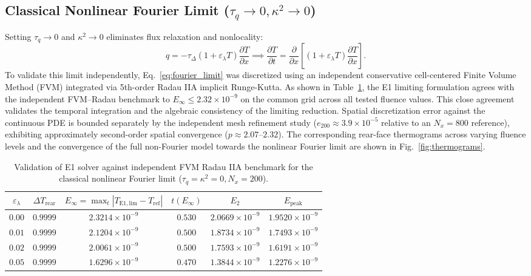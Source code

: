 \documentclass[preprint,12pt,a4paper]{elsarticle}
\begin{document}
\subsection{Classical Nonlinear Fourier Limit ($\tau_q \to 0, \kappa^2 \to 0$)}
Setting $\tau_q \to 0$ and $\kappa^2 \to 0$ eliminates flux relaxation and nonlocality:
\begin{equation}
  q = -\tau_\Delta (1 + \varepsilon_\lambda T) \frac{\partial T}{\partial x} \implies \frac{\partial T}{\partial t} = \frac{\partial}{\partial x}\left[\left(1 + \varepsilon_\lambda T\right)\frac{\partial T}{\partial x}\right] .
  \label{eq:fourier_limit}
\end{equation}
To validate this limit independently, Eq.~\eqref{eq:fourier_limit} was discretized using an independent conservative cell-centered Finite Volume Method (FVM) integrated via 5th-order Radau IIA implicit Runge-Kutta. As shown in Table~\ref{tab:fourier_val}, the E1 limiting formulation agrees with the independent FVM--Radau benchmark to $E_\infty \le 2.32 \times 10^{-9}$ on the common grid across all tested fluence values. This close agreement validates the temporal integration and the algebraic consistency of the limiting reduction. Spatial discretization error against the continuous PDE is bounded separately by the independent mesh refinement study ($e_{200} \approx 3.9 \times 10^{-5}$ relative to an $N_x = 800$ reference), exhibiting approximately second-order spatial convergence ($p \approx 2.07$--$2.32$). The corresponding rear-face thermograms across varying fluence levels and the convergence of the full non-Fourier model towards the nonlinear Fourier limit are shown in Fig.~\ref{fig:thermograms}.

\begin{table}[htbp]
  \centering
  \caption{Validation of E1 solver against independent FVM Radau IIA benchmark for the classical nonlinear Fourier limit ($\tau_q = \kappa^2 = 0, N_x = 200$).}
  \label{tab:fourier_val}
  \small
  \begin{tabular}{@{}cccccc@{}}
    \toprule
    $\varepsilon_\lambda$ & $\Delta T_{\mathrm{rear}}$ & $E_\infty = \max_t |T_{\mathrm{E1,lim}} - T_{\mathrm{ref}}|$ & $t(E_\infty)$ & $E_2$ & $E_{\mathrm{peak}}$ \\
    \midrule
    $0.00$ & $0.9999$ & $2.3214 \times 10^{-9}$ & $0.530$ & $2.0669 \times 10^{-9}$ & $1.9520 \times 10^{-9}$ \\
    $0.01$ & $0.9999$ & $2.1204 \times 10^{-9}$ & $0.500$ & $1.8734 \times 10^{-9}$ & $1.7493 \times 10^{-9}$ \\
    $0.02$ & $0.9999$ & $2.0061 \times 10^{-9}$ & $0.500$ & $1.7593 \times 10^{-9}$ & $1.6191 \times 10^{-9}$ \\
    $0.05$ & $0.9999$ & $1.6296 \times 10^{-9}$ & $0.470$ & $1.3844 \times 10^{-9}$ & $1.2276 \times 10^{-9}$ \\
    \bottomrule
  \end{tabular}
\end{table}
\end{document}
